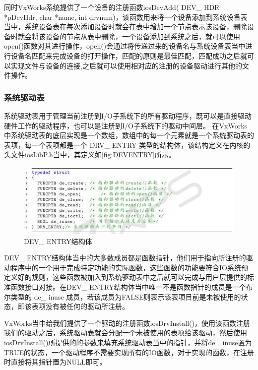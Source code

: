 同时VxWorks系统提供了一个设备的注册函数iosDevAdd( DEV\_ HDR *pDevHdr, char *name, int drvnum)，该函数用来将一个设备添加到系统设备表当中，系统设备表在每次添加设备时就会在表中增加一个节点表示该设备，删除设备时就会将该设备的节点从表中删除，一个设备添加到系统之后，就可以使用open()函数对其进行操作，open()会通过将传递过来的设备名与系统设备表当中进行设备名匹配来完成设备的打开操作，匹配的原则是最佳匹配，匹配成功之后就可以实现文件与设备的连接\cite{刘小军2008基于},之后就可以使用相对应的注册的设备驱动进行其他的文件操作。

\subsubsection{系统驱动表}	
	系统驱动表用于管理当前注册到I/O子系统下的所有驱动程序，既可以是直接驱动硬件工作的驱动程序，也可以是注册到I/O子系统下的驱动中间层\cite{VxWorks内核解读}。
	在VxWorks中系统驱动表的底层实现是一个数组，数组中的每一个元素就是一个系统驱动表的表项，每一个表项都是一个 DRV\_ ENTRY 类型的结构体，该结构定义在内核的头文件iosLibP.h当中，其定义如\autoref{fig:DEVENTRY}所示。
	
\begin{figure}[!h]
\centering
\includegraphics[width=1.0\textwidth]{./graphics/DEVENTRY.pdf}
\caption{DEV\_ ENTRY结构体}\label{fig:DEVENTRY}
\end{figure}

	DEV\_ ENTRY结构体当中的大多数成员都是函数指针，他们用于指向所注册的驱动程序中的一个用于完成特定功能的实际函数，这些函数的功能要符合IO系统预定义好的规则，这些函数被加入到系统驱动表中之后就可以完成与用户层提供的标准函数接口对接\cite{VxWorks内核解读}\cite{VxWorksDriverAPI}\cite{Wind2003VxWorks}。在DEV\_ ENTRY结构体当中唯一不是函数指针的成员是一个布尔类型的 de\_ inuse 成员，若该成员为FALSE则表示该表项目前是未被使用的状态，即该表项没有被任何的驱动所注册。

	VxWorks当中给我们提供了一个驱动的注册函数iosDrvInstall()，使用该函数注册我们的驱动之后，系统驱动表就会分配一个未被使用的表项给该驱动，然后使用iosDrvInstall()所提供的的参数来填充系统驱动表当中的指针，并将de\_ inuse置为TRUE的状态，一个驱动程序不需要实现所有的IO函数，对于实现的函数，在注册时直接将其指针置为NULL即可。


